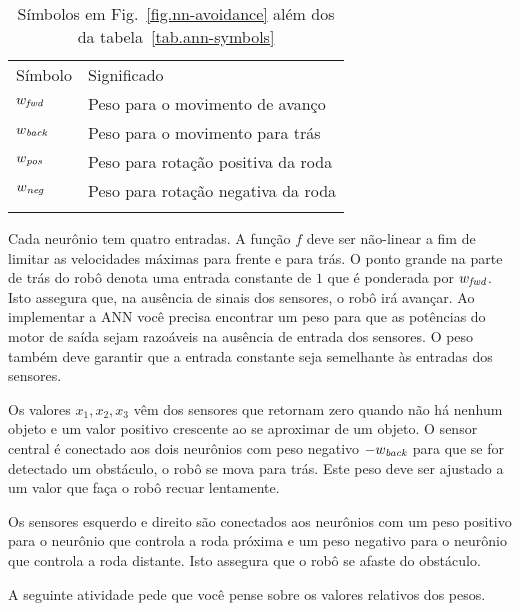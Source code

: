 \begin{table}
\caption{Símbolos em Fig.~\ref{fig.nn-avoidance} além dos da tabela~\ref{tab.ann-symbols}}
\label{tab.obstacle-avoidance}
\begin{tabular}{p{2cm}p{5.5cm}}
\hline\noalign{\smallskip}
Símbolo & Significado \\
\noalign{\smallskip}\hline\noalign{\smallskip}
$w_{\textit{\scriptsize fwd}}$ & Peso para o movimento de avanço\\
$w_{\textit{\scriptsize back}}$ & Peso para o movimento para trás\\
$w_{\textit{\scriptsize pos}}$ & Peso para rotação positiva da roda\\
$w_{\textit{\scriptsize neg}}$ & Peso para rotação negativa da roda\\
\noalign{\smallskip}\hline\noalign{\smallskip}
\end{tabular}
\end{table}

Cada neurônio tem quatro entradas. A função $f$ deve ser não-linear a fim de limitar as velocidades máximas para frente e para trás. O ponto grande na parte de trás do robô denota uma entrada constante de $1$ que é ponderada por $w_{\textit{\scriptsize fwd}}$. Isto assegura que, na ausência de sinais dos sensores, o robô irá avançar. Ao implementar a ANN você precisa encontrar um peso para que as potências do motor de saída sejam razoáveis na ausência de entrada dos sensores. O peso também deve garantir que a entrada constante seja semelhante às entradas dos sensores.

Os valores $x_1, x_2, x_3$ vêm dos sensores que retornam zero quando não há nenhum objeto e um valor positivo crescente ao se aproximar de um objeto. O sensor central é conectado aos dois neurônios com peso negativo $-w_{\textit{\scriptsize back}}$ para que se for detectado um obstáculo, o robô se mova para trás. Este peso deve ser ajustado a um valor que faça o robô recuar lentamente.

Os sensores esquerdo e direito são conectados aos neurônios com um peso positivo para o neurônio que controla a roda próxima e um peso negativo para o neurônio que controla a roda distante. Isto assegura que o robô se afaste do obstáculo.

A seguinte atividade pede que você pense sobre os valores relativos dos pesos.

